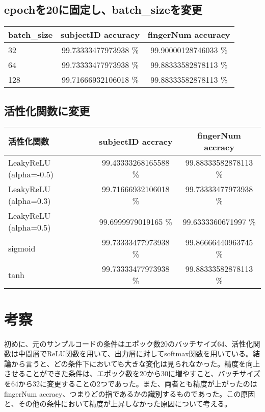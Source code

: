 \documentclass[a4paper, 11pt, titlepage]{jsarticle}
\begin{document}
\subsection{epochを20に固定し、batch\_sizeを変更}%
\begin{table}[htb]
  \begin{tabular}{|l|c|c|}
    \hline
    batch\_size & subjectID accuracy & fingerNum accuracy  \\ \hline
    32 & 99.73333477973938 \% & 99.90000128746033 \% \\ \hline
    64 & 99.73333477973938 \% & 99.88333582878113 \% \\ \hline
    128 & 99.71666932106018 \% & 99.88333582878113 \% \\ \hline
  \end{tabular}
\end{table}

\subsection{活性化関数に変更}
\begin{table}[htb]
  \begin{tabular}{|l|c|c|}
    \hline
    活性化関数 & subjectID accracy & fingerNum accracy \\ \hline
    LeakyReLU (alpha=-0.5) & 99.43333268165588 \% & 99.88333582878113 \% \\ \hline
    LeakyReLU (alpha=0.3) & 99.71666932106018 \% & 99.73333477973938 \% \\ \hline
    LeakyReLU (alpha=0.5) & 99.6999979019165 \% & 99.6333360671997 \% \\ \hline
    sigmoid & 99.73333477973938 \% & 99.86666440963745 \% \\ \hline
    tanh & 99.73333477973938 \% & 99.88333582878113 \% \\ \hline
  \end{tabular}
\end{table}

\clearpage

\section{考察}
初めに、元のサンプルコードの条件はエポック数20のバッチサイズ64、活性化関数は中間層でReLU関数を用いて、出力層に対してsoftmax関数を用いている。結論から言うと、どの条件下においても大きな変化は見られなかった。精度を向上させることができた条件は、エポック数を20から30に増やすこと、バッチサイズを64から32に変更することの2つであった。また、両者とも精度が上がったのは fingerNum accracy、つまりどの指であるかの識別するものであった。この原因と、その他の条件において精度が上昇しなかった原因について考える。
\end{document}
